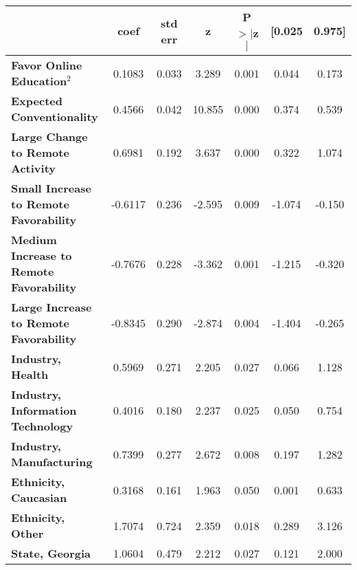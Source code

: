 {
\def\sym#1{\ifmmode^{#1}\else\(^{#1}\)\fi}
\begin{tabular}{lcccccc}
    \toprule
                                                    & \textbf{coef} & \textbf{std err} & \textbf{z} & \textbf{P$> |$z$|$} & \textbf{[0.025} & \textbf{0.975]} \\
    \midrule
    \textbf{Favor Online Education$^2$}             & 0.1083        & 0.033            & 3.289      & 0.001               & 0.044           & 0.173           \\
    \textbf{Expected Conventionality}               & 0.4566        & 0.042            & 10.855     & 0.000               & 0.374           & 0.539           \\
    \textbf{Large Change to Remote Activity}        & 0.6981        & 0.192            & 3.637      & 0.000               & 0.322           & 1.074           \\
    \textbf{Small Increase to Remote Favorability}  & -0.6117       & 0.236            & -2.595     & 0.009               & -1.074          & -0.150          \\
    \textbf{Medium Increase to Remote Favorability} & -0.7676       & 0.228            & -3.362     & 0.001               & -1.215          & -0.320          \\
    \textbf{Large Increase to Remote Favorability}  & -0.8345       & 0.290            & -2.874     & 0.004               & -1.404          & -0.265          \\
    \textbf{Industry, Health}                       & 0.5969        & 0.271            & 2.205      & 0.027               & 0.066           & 1.128           \\
    \textbf{Industry, Information Technology}       & 0.4016        & 0.180            & 2.237      & 0.025               & 0.050           & 0.754           \\
    \textbf{Industry, Manufacturing}                & 0.7399        & 0.277            & 2.672      & 0.008               & 0.197           & 1.282           \\
    \textbf{Ethnicity, Caucasian}                   & 0.3168        & 0.161            & 1.963      & 0.050               & 0.001           & 0.633           \\
    \textbf{Ethnicity, Other}                       & 1.7074        & 0.724            & 2.359      & 0.018               & 0.289           & 3.126           \\
    \textbf{State, Georgia}                         & 1.0604        & 0.479            & 2.212      & 0.027               & 0.121           & 2.000           \\

\end{tabular}}
